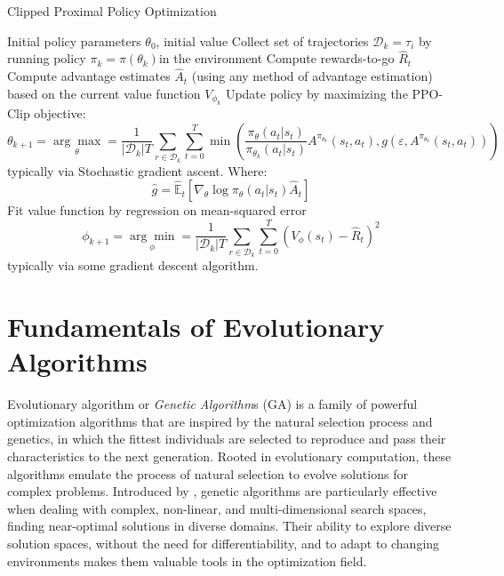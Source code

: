 \begin{algorithm}[H]
    \caption{Clipped Proximal Policy Optimization}
    \label{alg:ppo}
    \begin{algorithmic}[1]
        \Require Initial policy parameters $\theta _0$, initial value
        \State Collect set of trajectories $\mathcal{D} _k = \tau _i$ by running policy $\pi _k = \pi(\theta _k)$in the environment
        \State Compute rewards-to-go $\hat{R} _t$
        \State Compute advantage estimates $\hat{A} _t$
        (using any method of advantage estimation) based on the current value function $V _{\phi _k}$
        \State Update policy by maximizing the PPO-Clip objective:
        $$
            \theta _{k + 1} = \underset{\theta}{\arg\max} = \frac{1}{|\mathcal{D} _k|T} \sum _{r \in \mathcal{D} _k} \sum _{t = 0} ^{T} \min \left( \frac{\pi _{\theta} (a _t | s _t)}{\pi _{\theta_k} (a _t | s _t)} A ^{\pi _{\theta_k}} (s _t, a _t), g(\varepsilon, A ^{\pi _{\theta_k}}(s _t, a _t)) \right)
        $$
        typically via Stochastic gradient ascent. Where:
        $$
            \hat{g} = \hat{\mathbb{E}} _t \left[\nabla _{\theta}\log\pi _{\theta}(a _t | s _t) \hat{A} _t\right]
        $$
        \State Fit value function by regression on mean-squared error
        $$
            \phi _{k + 1} = \underset{\phi}{\arg\min} = \frac{1}{|\mathcal{D} _k|T} \sum _{r \in \mathcal{D} _k} \sum _{t = 0} ^{T} \left(V _{\phi}(s _t) - \hat{R} _t \right)^2
        $$
        typically via some gradient descent algorithm.
        \EndFor
    \end{algorithmic}
\end{algorithm}

\section{Fundamentals of Evolutionary Algorithms}

Evolutionary algorithm or \textit{Genetic Algorithm}s (\ac{GA}) is a family of powerful optimization algorithms that are inspired by the natural selection
process and genetics, in which the fittest individuals are selected to reproduce and pass their characteristics to the next generation. Rooted in evolutionary computation, these algorithms emulate the process of natural selection to evolve solutions for complex problems. Introduced by \citet{holland_1992_ga}, genetic algorithms are particularly effective when dealing with complex, non-linear, and multi-dimensional search spaces, finding near-optimal solutions in diverse domains. Their ability to explore diverse solution spaces, without the need for differentiability, and to adapt to changing environments makes them valuable tools in the optimization field. \citep{katoch_review_2021}

